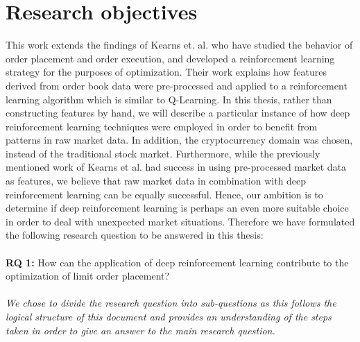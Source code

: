 \section{Research objectives}
\label{sec:intro-rq}

This work extends the findings of Kearns et. al. who have studied the behavior of order placement and order execution\cite{nevmyvaka2005electronic}, and developed a reinforcement learning strategy\cite{nevmyvaka2006reinforcement} for the purposes of optimization.
Their work explains how features derived from order book data were pre-processed and applied to a reinforcement learning algorithm which is similar to Q-Learning.
In this thesis, rather than constructing features by hand, we will describe a particular instance of how deep reinforcement learning techniques were employed in order to benefit from patterns in raw market data.
In addition, the cryptocurrency domain was chosen, instead of the traditional stock market.
Furthermore, while the previously mentioned work of Kearns et al. had success in using pre-processed market data as features, we believe that raw market data in combination with deep reinforcement learning can be equally successful.
Hence, our ambition is to determine if deep reinforcement learning is perhaps an even more suitable choice in order to deal with unexpected market situations.
Therefore we have formulated the following research question to be answered in this thesis:
\\
\\
\textbf{RQ 1:} How can the application of deep reinforcement learning contribute to the optimization of limit order placement?
\\
\\
\textit{We chose to divide the research question into sub-questions as this follows the logical structure of this document and provides an understanding of the steps taken in order to give an answer to the main research question.}

